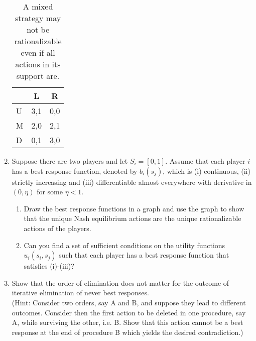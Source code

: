 \documentclass[a4paper,12pt]{article}
\begin{document}
\begin{enumerate}
\begin{table}[h]
\begin{tabular}{l|c|c}
      & L &R\\ \hline
      U& 3,1  &0,0  \\
      M&2,0&2,1 \\
      D& 0,1 & 3,0
    \end{tabular}
    \caption{A mixed strategy may not be rationalizable even if all actions in its support are.
}
    \label{tab:mixNotRatio}
  \end{table}
\item Suppose there are two players and let $S_i=[0,1]$. Assume that each player $i$ has a best response function, denoted by $b_i(s_j)$, which is (i) continuous, (ii) strictly increasing and (iii)  differentiable almost everywhere with derivative in $(0,\eta)$ for some $\eta<1$.
  \begin{enumerate}
  \item Draw the best response functions in a graph and use the graph to show that the unique Nash equilibrium actions are the unique rationalizable actions of the players.
    \item Can you find a set of sufficient conditions on the utility functions $u_i(s_i,s_j)$ such that each player has a best response function that satisfies (i)-(iii)?
    \end{enumerate}
  \item Show that the order of elimination does not matter for the outcome of iterative elimination of never best responses. \\(Hint: Consider two orders, say A and B, and suppose they lead to different outcomes. Consider then the first action to be deleted in one procedure, say A, while surviving the other, i.e. B. Show that this action cannot be a best response at the end of procedure B which yields the desired contradiction.)
    

\end{enumerate}
\end{document}

